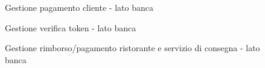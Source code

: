 \documentclass[11pt]{article} %
\begin{document}
\begin{figure}[!ht]
\begin{center}
\caption{Gestione pagamento cliente - lato banca}
\end{center}
\end{figure}

\begin{figure}[!ht]
\begin{center}
\caption{Gestione verifica token - lato banca}
\end{center}
\end{figure}

\begin{figure}[!ht]
\begin{center}
\caption{Gestione rimborso/pagamento ristorante e servizio di consegna - lato banca}
\end{center}
\end{figure}
\end{document}
